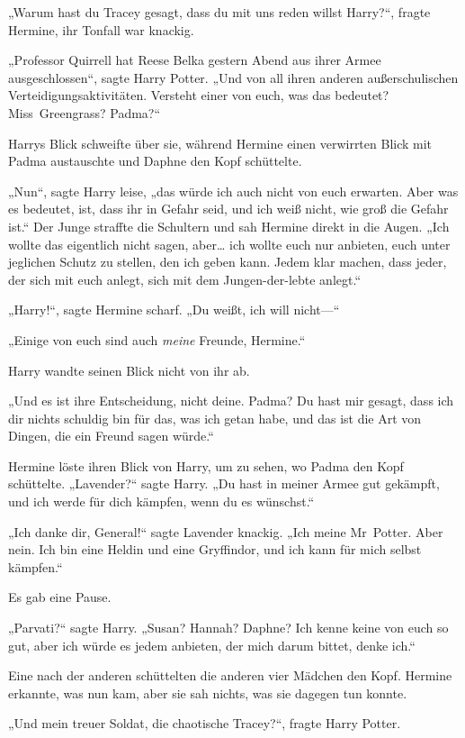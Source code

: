 {„Warum hast du Tracey gesagt, dass du mit uns reden willst Harry?“, fragte Hermine, ihr Tonfall war knackig.

„Professor Quirrell hat Reese Belka gestern Abend aus ihrer Armee ausgeschlossen“, sagte Harry Potter. „Und von all ihren anderen außerschulischen Verteidigungsaktivitäten. Versteht einer von euch, was das bedeutet? Miss~Greengrass? Padma?“

Harrys Blick schweifte über sie, während Hermine einen verwirrten Blick mit Padma austauschte und Daphne den Kopf schüttelte.

„Nun“, sagte Harry leise, „das würde ich auch nicht von euch erwarten. Aber was es bedeutet, ist, dass ihr in Gefahr seid, und ich weiß nicht, wie groß die Gefahr ist.“ Der Junge straffte die Schultern und sah Hermine direkt in die Augen. „Ich wollte das eigentlich nicht sagen, aber… ich wollte euch nur anbieten, euch unter jeglichen Schutz zu stellen, den ich geben kann. Jedem klar machen, dass jeder, der sich mit euch anlegt, sich mit dem Jungen-der-lebte anlegt.“

„Harry!“, sagte Hermine scharf. „Du weißt, ich will nicht—“

„Einige von euch sind auch \emph{meine} Freunde, Hermine.“

Harry wandte seinen Blick nicht von ihr ab.

„Und es ist ihre Entscheidung, nicht deine. Padma? Du hast mir gesagt, dass ich dir nichts schuldig bin für das, was ich getan habe, und das ist die Art von Dingen, die ein Freund sagen würde.“

Hermine löste ihren Blick von Harry, um zu sehen, wo Padma den Kopf schüttelte. „Lavender?“ sagte Harry. „Du hast in meiner Armee gut gekämpft, und ich werde für dich kämpfen, wenn du es wünschst.“

„Ich danke dir, General!“ sagte Lavender knackig. „Ich meine Mr~Potter. Aber nein. Ich bin eine Heldin und eine Gryffindor, und ich kann für mich selbst kämpfen.“

Es gab eine Pause.

„Parvati?“ sagte Harry. „Susan? Hannah? Daphne? Ich kenne keine von euch so gut, aber ich würde es jedem anbieten, der mich darum bittet, denke ich.“

Eine nach der anderen schüttelten die anderen vier Mädchen den Kopf. Hermine erkannte, was nun kam, aber sie sah nichts, was sie dagegen tun konnte.

„Und mein treuer Soldat, die chaotische Tracey?“, fragte Harry Potter.

}
